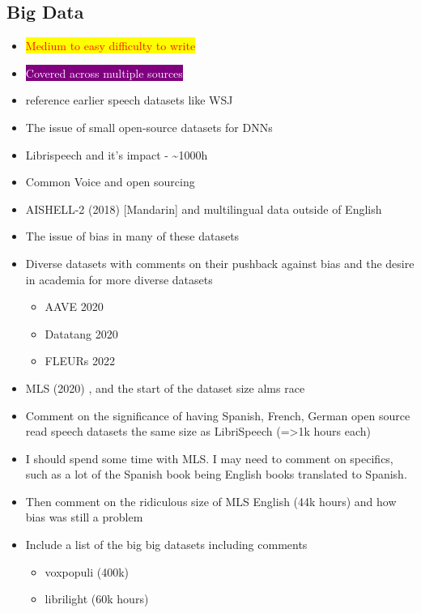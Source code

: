 \subsection{Big Data}
\begin{itemize}
    \item \colorbox{yellow}{\textcolor{red}{Medium to easy difficulty to write}}
    \item \colorbox{purple}{\textcolor{white}{Covered across multiple sources}}
    \item reference earlier speech datasets like WSJ
    \item The issue of small open-source datasets for DNNs
    \item Librispeech \cite{librispeech} and it's impact - \textasciitilde 1000h
    \item Common Voice \cite{ardila-etal-2020-common} and open sourcing
    \item AISHELL-2 (2018) [Mandarin] \cite{needtoadd} and multilingual data outside of English
    \item The issue of bias in many of these datasets
    \item Diverse datasets with comments on their pushback against bias and the desire in academia for more diverse datasets
    \begin{itemize}
        \item AAVE 2020 \cite{chang2024self}
        \item Datatang 2020 \cite{aesrc2020}
        \item FLEURs 2022 \cite{FLEURS} 
    \end{itemize}
    \item MLS (2020) \cite{MLS},  and the start of the dataset size alms race
    \item Comment on the significance of having Spanish, French, German open source read speech datasets the same size as LibriSpeech (=>1k hours each)
    \item I should spend some time with MLS. I may need to comment on specifics, such as a lot of the Spanish book being English books translated to Spanish.
    \item Then comment on the ridiculous size of MLS English (44k hours) and how bias was still a problem
    \item Include a list of the big big datasets including comments
    \begin{itemize}
        \item voxpopuli (400k) \cite{wang-etal-2021-voxpopuli}
        \item librilight (60k hours) \cite{librilight}

\end{itemize}
\end{itemize}
